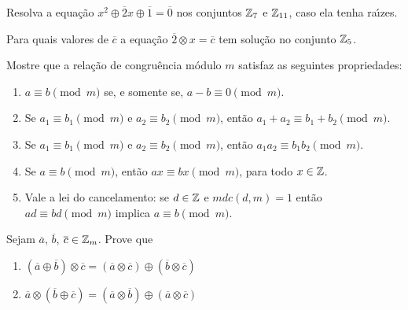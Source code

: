 \documentclass[12pt]{exam}
\begin{document}
    \vspace{.3cm}

    \questao{} Resolva a equa\c{c}\~ao $x^2 \oplus \overline{2}x \oplus \overline{1} = \overline{0}$ nos conjuntos $\mathbb{Z}_7$ e $\mathbb{Z}_{11}$, caso ela tenha ra{\'\i}zes.

    \vspace{.3cm}

    \questao{} Para quais valores de $\overline{c}$ a equa\c{c}\~ao $\overline{2}\otimes x = \overline{c}$ tem solu\c{c}\~ao no conjunto $\mathbb{Z}_5$.

    \vspace{.3cm}

    \questao{} Mostre que a rela{\c c}{\~a}o de congru{\^e}ncia m{\'o}dulo $m$ satisfaz as seguintes propriedades:
    \begin{enumerate}[label=({\alph*})]
      \item $a\equiv b\pmod{m}$ se, e somente se, $a - b\equiv 0\pmod{m}$.
      \item Se $a_{1}\equiv b_{1}\pmod{m}$ e $a_{2}\equiv b_{2}\pmod{m}$, ent{\~a}o $a_{1}+a_{2}\equiv b_{1}+b_{2}\pmod{m}$.
      \item Se $a_{1}\equiv b_{1}\pmod{m}$ e $a_{2}\equiv b_{2}\pmod{m}$, ent{\~a}o $a_{1}a_{2}\equiv b_{1}b_{2}\pmod{m}$.\label{item_provado}
      \item Se $a\equiv b\pmod{m}$, ent{\~a}o $ax\equiv bx\pmod{m}$, para todo $x \in \mathbb{Z}$.
      \item Vale a lei do cancelamento: se $d \in \mathbb{Z}$ e $mdc(d,m) = 1$ ent{\~a}o $ad \equiv bd \pmod{m}$ implica $a\equiv b \pmod{m}$.
    \end{enumerate}

    \vspace{.3cm}

    \questao{} Sejam $\overline{a}$, $\overline{b}$, $\overline{c} \in \mathbb{Z}_m$. Prove que
    \begin{enumerate}[label=({\alph*})]
        \item $(\overline{a} \oplus \overline{b}) \otimes \overline{c} = (\overline{a} \otimes \overline{c}) \oplus (\overline{b} \otimes \overline{c})$

        \item $\overline{a} \otimes (\overline{b} \oplus \overline{c}) = (\overline{a} \otimes \overline{b}) \oplus (\overline{a} \otimes \overline{c})$
    \end{enumerate}

    \vspace{.3cm}
\end{document}
